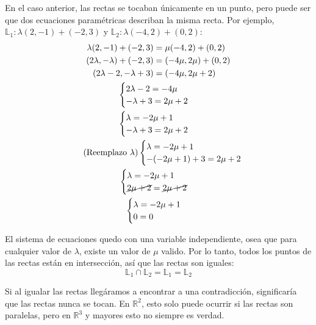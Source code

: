 \documentclass[../teoria.root.tex]{subfiles}
\begin{document}
En el caso anterior, las rectas se tocaban únicamente en un punto, pero puede
ser que dos ecuaciones paramétricas describan la misma recta. Por ejemplo,
$\mathbb{L}_1:\lambda(2,-1)+(-2,3)$ y $\mathbb{L}_2:\lambda(-4,2)+(0,2)$:
\begin{gather*}
	\begin{split}
		\lambda(2,-1)+(-2,3)&=\mu(-4,2)+(0,2)\\
		(2\lambda,-\lambda)+(-2,3)&=(-4\mu,2\mu)+(0,2)\\
		(2\lambda-2,-\lambda+3)&=(-4\mu,2\mu+2)
	\end{split}\\
	\begin{cases}
		2\lambda-2=-4\mu\\
		-\lambda+3=2\mu+2
	\end{cases}\\
	\begin{cases}
		\lambda=-2\mu+1\\
		-\lambda+3=2\mu+2
	\end{cases}\\
	\tag{Reemplazo $\lambda$}
	\begin{cases}
		\lambda=-2\mu+1\\
		-(-2\mu+1)+3=2\mu+2
	\end{cases}\\
	\begin{cases}
		\lambda=-2\mu+1\\
		\cancel{2\mu+2}=\cancel{2\mu+2}
	\end{cases}\\
	\begin{cases}
		\lambda=-2\mu+1\\
		0=0
	\end{cases}
\end{gather*}

El sistema de ecuaciones quedo con una variable independiente, osea que para
cualquier valor de $\lambda$, existe un valor de $\mu$ valido. Por lo tanto,
todos los puntos de las rectas están en intersección, así que las rectas son
iguales:
\[\mathbb{L}_1\cap\mathbb{L}_2=\mathbb{L}_1=\mathbb{L}_2\]

Si al igualar las rectas llegáramos a encontrar a una contradicción,
significaría que las rectas nunca se tocan. En $\mathbb{R}^2$, esto solo puede
ocurrir si las rectas son paralelas, pero en $\mathbb{R}^3$ y mayores esto no
siempre es verdad.
\end{document}
